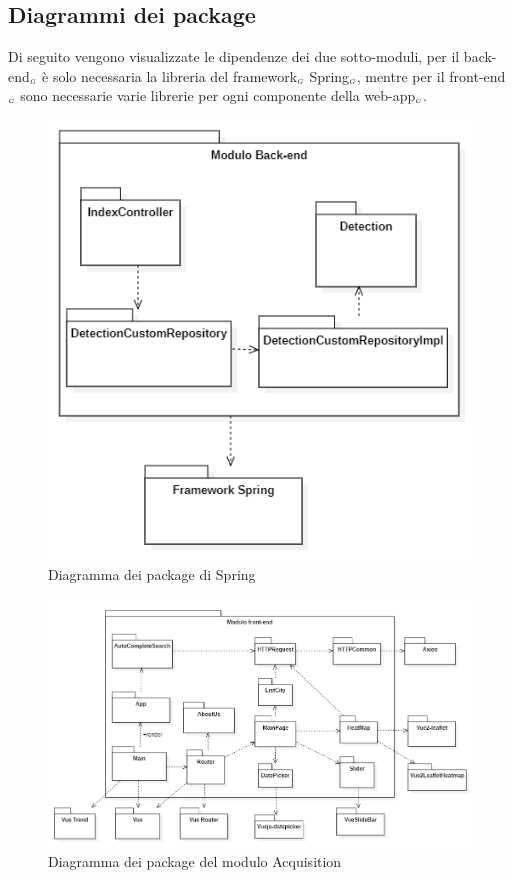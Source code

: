 \subsection{Diagrammi dei package}\label{ArchitetturaModuloWebAppDiagrammiDeiPackage}
Di seguito vengono visualizzate le dipendenze dei due sotto-moduli, per il back-end$_{\scaleto{G}{3pt}}$ è solo necessaria la libreria del framework$_{\scaleto{G}{3pt}}$ Spring$_{\scaleto{G}{3pt}}$, mentre per il front-end$_{\scaleto{G}{3pt}}$ sono necessarie varie librerie per ogni componente della web-app$_{\scaleto{G}{3pt}}$.
\begin{figure}[H]
  \begin{center}
    \includegraphics[scale=0.8]{../immagini/diag_PB/diag_pack_spring.png}
    \caption{Diagramma dei package di Spring}
  \end{center}
\end{figure}

\begin{figure}[H]
  \begin{center}
    \includegraphics[scale=0.65]{../immagini/diag_PB/diag_pack_vue.png}
    \caption{Diagramma dei package del modulo Acquisition}
  \end{center}
\end{figure}

